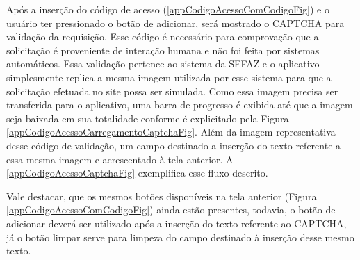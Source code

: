 \newpage
Após a inserção do código de acesso (\autoref{appCodigoAcessoComCodigoFig}) e o usuário ter pressionado o botão de adicionar, será mostrado o CAPTCHA para validação da requisição. Esse código é necessário para comprovação que a solicitação é proveniente de interação humana e não foi feita por sistemas automáticos. Essa validação pertence ao sistema da SEFAZ e o aplicativo simplesmente replica a mesma imagem utilizada por esse sistema para que a solicitação efetuada no site possa ser simulada. Como essa imagem precisa ser transferida para o aplicativo, uma barra de progresso é exibida até que a imagem seja baixada em sua totalidade conforme é explicitado pela Figura \ref{appCodigoAcessoCarregamentoCaptchaFig}. Além da imagem representativa desse código de validação, um campo destinado a inserção do texto referente a essa mesma imagem e acrescentado à tela anterior. A \autoref{appCodigoAcessoCaptchaFig} exemplifica esse fluxo descrito.

Vale destacar, que os mesmos botões disponíveis na tela anterior (Figura \ref{appCodigoAcessoComCodigoFig}) ainda estão presentes, todavia, o botão de adicionar deverá ser utilizado após a inserção do texto referente ao CAPTCHA, já o botão limpar serve para limpeza do campo destinado à inserção desse mesmo texto.

